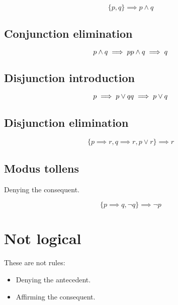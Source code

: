 \documentclass[a4paper,10pt]{report}
\begin{document}
\begin{equation*}
 \{p, q\} \implies p \land q
\end{equation*}

\subsection{Conjunction elimination}

\begin{equation*}
 p \land q \implies p \\
 p \land q \implies q
\end{equation*}

\subsection{Disjunction introduction}

\begin{equation*}
 p \implies p \lor q \\
 q \implies p \lor q
\end{equation*}

\subsection{Disjunction elimination}

\begin{equation*}
 \{p \implies r, q \implies r, p \lor r\} \implies r
\end{equation*}

\subsection{Modus tollens}

Denying the consequent.

\begin{equation*}
 \{p \implies q, \lnot q\} \implies \lnot p
\end{equation*}

\section{Not logical}
These are not rules:

\begin{itemize}
 \item Denying the antecedent.
 \item Affirming the consequent.
\end{itemize}
\end{document}
